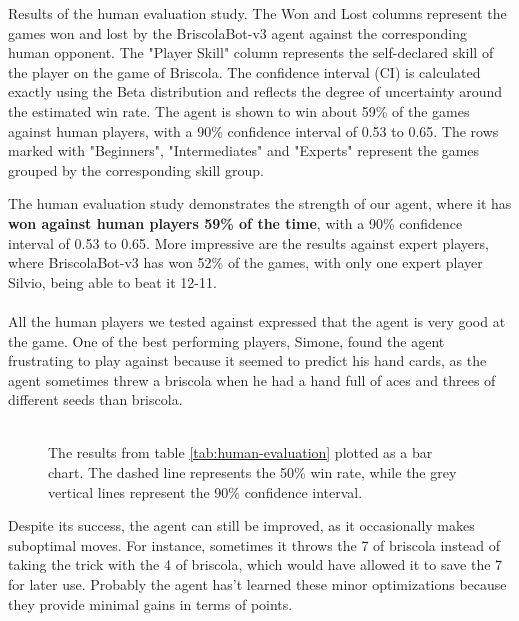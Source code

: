\begin{table}[H]
    \caption{Results of the human evaluation study. The Won and Lost columns represent the games won and lost by the BriscolaBot-v3 agent against the corresponding human opponent. The "Player Skill" column represents the self-declared skill of the player on the game of Briscola. The confidence interval (CI) is calculated exactly using the Beta distribution and reflects the degree of uncertainty around the estimated win rate. The agent is shown to win about 59\% of the games against human players, with a 90\% confidence interval of 0.53 to 0.65. The rows marked with "Beginners", "Intermediates" and "Experts" represent the games grouped by the corresponding skill group.}
    \label{tab:human-evaluation}
\end{table}

The human evaluation study demonstrates the strength of our agent, where it has \textbf{won against human players 59\% of the time}, with a 90\% confidence interval of 0.53 to 0.65. More impressive are the results against expert players, where BriscolaBot-v3 has won 52\% of the games, with only one expert player Silvio, being able to beat it 12-11.\\\\
All the human players we tested against expressed that the agent is very good at the game. One of the best performing players, Simone, found the agent frustrating to play against because it seemed to predict his hand cards, as the agent sometimes threw a briscola when he had a hand full of aces and threes of different seeds than briscola.\\\\

\begin{figure}[H]
    
    \caption{The results from table \ref{tab:human-evaluation} plotted as a bar chart. The dashed line represents the 50\% win rate, while the grey vertical lines represent the 90\% confidence interval.}
    \label{fig:player-scores}
\end{figure}


Despite its success, the agent can still be improved, as it occasionally makes suboptimal moves. For instance, sometimes it throws the 7 of briscola instead of taking the trick with the 4 of briscola, which would have allowed it to save the 7 for later use. Probably the agent has't learned these minor optimizations because they provide minimal gains in terms of points.
